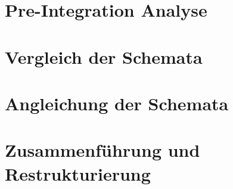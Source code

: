 \documentclass[11pt,a4paper,DIV=9]{scrartcl}
\begin{document}
\section{Pre-Integration Analyse}
\section{Vergleich der Schemata}
\section{Angleichung der Schemata}
\section{Zusammenführung und Restrukturierung}



\end{document}
